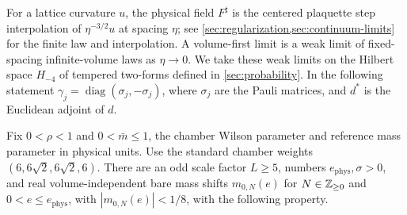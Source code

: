 For a lattice curvature $u$, the physical field $F^\sharp$ is the
centered plaquette step interpolation of $\eta^{-3/2}u$ at spacing
$\eta$; see \cref{sec:regularization,sec:continuum-limits} for the
finite law and interpolation. A volume-first limit is a weak limit
of fixed-spacing infinite-volume laws as $\eta\to0$. We take these
weak limits on the Hilbert space $H_{-4}$ of tempered two-forms
defined in \cref{sec:probability}. In the following statement
$\gamma_j=\operatorname{diag}(\sigma_j,-\sigma_j)$, where $\sigma_j$
are the Pauli matrices, and $d^*$ is the Euclidean adjoint of $d$.

\begin{theorem}\label{thm:main}
Fix $0<\rho<1$ and $0<\bar m\le1$, the chamber Wilson parameter and
reference mass parameter in physical units. Use the standard chamber weights
$(6,6\sqrt2,6\sqrt2,6)$. There are an odd scale factor $L\ge5$,
numbers $e_{\mathrm{phys}},\sigma>0$, and real volume-independent bare mass shifts
$m_{0,N}(e)$ for $N\in\mathbb Z_{\ge0}$ and $0<e\le e_{\mathrm{phys}}$, with
$|m_{0,N}(e)|<1/8$, with the following property.


\end{theorem}
